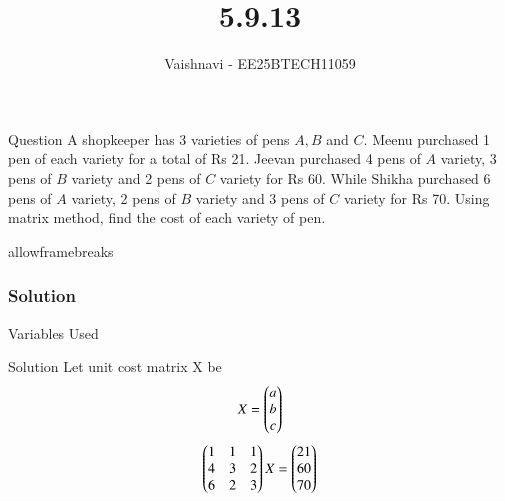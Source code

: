 \documentclass{beamer}
\title %
{5.9.13}
\author %
{Vaishnavi - EE25BTECH11059}
\begin{document}
\frame{\titlepage}
\begin{frame}{Question}
A shopkeeper has 3 varieties of pens \( A, B \) and \( C \). Meenu purchased 1 pen of each variety for a total of Rs 21. Jeevan purchased 4 pens of \( A \) variety, 3 pens of \( B \) variety and 2 pens of \( C \) variety for Rs 60. While Shikha purchased 6 pens of \( A \) variety, 2 pens of \( B \) variety and 3 pens of \( C \) variety for Rs 70. Using matrix method, find the cost of each variety of pen.
 \end{frame}
\begin{frame}{allowframebreaks}
\frametitle{Solution}
\begin{table}[H]    
  \centering
  
  \caption{Variables Used}
  \label{tab:1.10.25}
\end{table}

\end{frame}


\begin{frame}{Solution}
Let unit cost matrix X be 
\begin{align}
                                     X = \begin{pmatrix}
                                             a
                                              \\
                                              b
                                               \\
                                               c
                                              \end{pmatrix}
\end{align}
\begin{align}
 \begin{pmatrix}
        1 & 1 & 1
        \\
        4 & 3 & 2
        \\
        6 & 2 & 3
            \end{pmatrix}
X
=
\begin{pmatrix}
        21
        \\
        60
        \\
        70
        \end{pmatrix}
\end{align}

\end{frame}
\end{document}
